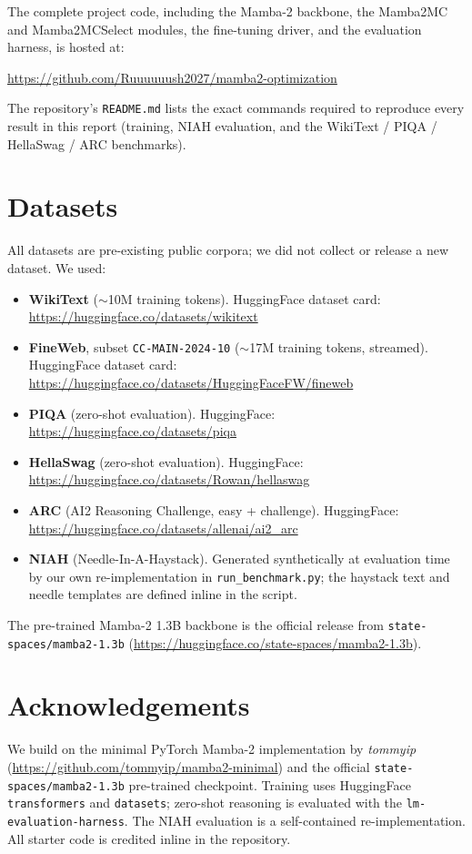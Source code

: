 \documentclass{article}
\begin{document}
The complete project code, including the Mamba-2 backbone, the Mamba2MC and Mamba2MCSelect modules, the fine-tuning driver, and the evaluation harness, is hosted at:

\url{https://github.com/Ruuuuuush2027/mamba2-optimization}

The repository's \texttt{README.md} lists the exact commands required to reproduce every result in this report (training, NIAH evaluation, and the WikiText / PIQA / HellaSwag / ARC benchmarks).

\section{Datasets}

All datasets are pre-existing public corpora; we did not collect or release a new dataset. We used:

\begin{itemize}
    \item \textbf{WikiText} ($\sim$10M training tokens). HuggingFace dataset card: \url{https://huggingface.co/datasets/wikitext}
    \item \textbf{FineWeb}, subset \texttt{CC-MAIN-2024-10} ($\sim$17M training tokens, streamed). HuggingFace dataset card: \url{https://huggingface.co/datasets/HuggingFaceFW/fineweb}
    \item \textbf{PIQA} (zero-shot evaluation). HuggingFace: \url{https://huggingface.co/datasets/piqa}
    \item \textbf{HellaSwag} (zero-shot evaluation). HuggingFace: \url{https://huggingface.co/datasets/Rowan/hellaswag}
    \item \textbf{ARC} (AI2 Reasoning Challenge, easy + challenge). HuggingFace: \url{https://huggingface.co/datasets/allenai/ai2_arc}
    \item \textbf{NIAH} (Needle-In-A-Haystack). Generated synthetically at evaluation time by our own re-implementation in \texttt{run\_benchmark.py}; the haystack text and needle templates are defined inline in the script.
\end{itemize}

The pre-trained Mamba-2 1.3B backbone is the official release from \texttt{state-spaces/mamba2-1.3b} (\url{https://huggingface.co/state-spaces/mamba2-1.3b}).

\section{Acknowledgements}

We build on the minimal PyTorch Mamba-2 implementation by \textit{tommyip} (\url{https://github.com/tommyip/mamba2-minimal}) and the official \texttt{state-spaces/mamba2-1.3b} pre-trained checkpoint. Training uses HuggingFace \texttt{transformers} and \texttt{datasets}; zero-shot reasoning is evaluated with the \texttt{lm-evaluation-harness}. The NIAH evaluation is a self-contained re-implementation. All starter code is credited inline in the repository.
\end{document}
